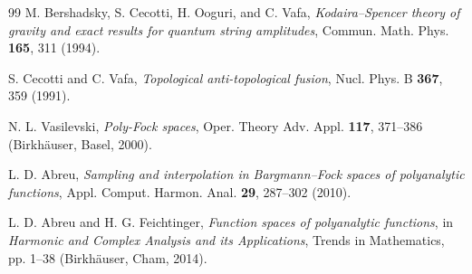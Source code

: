 \documentclass[11pt,a4paper]{article}
\begin{document}
\begin{thebibliography}{99}
M. Bershadsky, S. Cecotti, H. Ooguri, and C. Vafa,
\emph{Kodaira--Spencer theory of gravity and exact results for quantum string amplitudes},
Commun. Math. Phys. \textbf{165}, 311 (1994).

S. Cecotti and C. Vafa,
\emph{Topological anti-topological fusion},
Nucl. Phys. B \textbf{367}, 359 (1991).

N. L. Vasilevski,
\emph{Poly-Fock spaces},
Oper. Theory Adv. Appl. \textbf{117}, 371--386 (Birkh\"auser, Basel, 2000).

L. D. Abreu,
\emph{Sampling and interpolation in Bargmann--Fock spaces of polyanalytic functions},
Appl. Comput. Harmon. Anal. \textbf{29}, 287--302 (2010).

L. D. Abreu and H. G. Feichtinger,
\emph{Function spaces of polyanalytic functions},
in \emph{Harmonic and Complex Analysis and its Applications}, Trends in Mathematics,
pp. 1--38 (Birkh\"auser, Cham, 2014).

\end{thebibliography}
\end{document}
